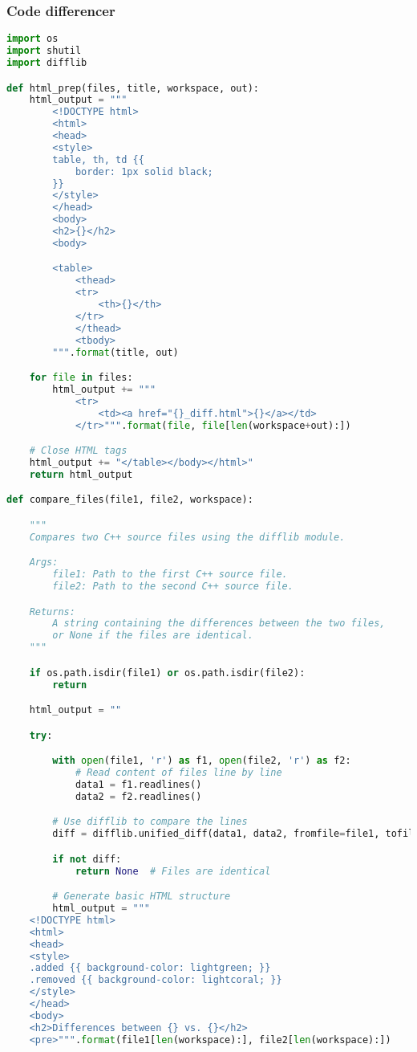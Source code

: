\subsubsection{Code differencer}

\begin{lstlisting}[language=python]
import os
import shutil
import difflib

def html_prep(files, title, workspace, out):
    html_output = """
        <!DOCTYPE html>
        <html>
        <head>
        <style>
        table, th, td {{
            border: 1px solid black;
        }}
        </style>
        </head>
        <body>
        <h2>{}</h2>
        <body>

        <table>
            <thead>
            <tr>
                <th>{}</th>
            </tr>
            </thead>
            <tbody>
        """.format(title, out)

    for file in files:
        html_output += """
            <tr>
                <td><a href="{}_diff.html">{}</a></td>
            </tr>""".format(file, file[len(workspace+out):])

    # Close HTML tags
    html_output += "</table></body></html>"
    return html_output

def compare_files(file1, file2, workspace):

    """
    Compares two C++ source files using the difflib module.

    Args:
        file1: Path to the first C++ source file.
        file2: Path to the second C++ source file.

    Returns:
        A string containing the differences between the two files,
        or None if the files are identical.
    """

    if os.path.isdir(file1) or os.path.isdir(file2):
        return

    html_output = ""

    try:

        with open(file1, 'r') as f1, open(file2, 'r') as f2:
            # Read content of files line by line
            data1 = f1.readlines()
            data2 = f2.readlines()

        # Use difflib to compare the lines
        diff = difflib.unified_diff(data1, data2, fromfile=file1, tofile=file2)

        if not diff:
            return None  # Files are identical

        # Generate basic HTML structure
        html_output = """
    <!DOCTYPE html>
    <html>
    <head>
    <style>
    .added {{ background-color: lightgreen; }}
    .removed {{ background-color: lightcoral; }}
    </style>
    </head>
    <body>
    <h2>Differences between {} vs. {}</h2>
    <pre>""".format(file1[len(workspace):], file2[len(workspace):])


\end{lstlisting}
